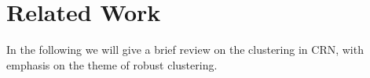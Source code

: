 \documentclass[times]{ettauth}
\newcommand{\eg}{e.g., }
\newcommand{\ie}{i.e., }
\theoremstyle{mytheoremstyle}
\theoremstyle{mytheoremstyle}
\theoremstyle{mytheoremstyle}
\begin{document}
\section{Related Work}
\label{related_work}
In the following we will give a brief review on the clustering in CRN, with emphasis on the theme of robust clustering.
\end{document}
